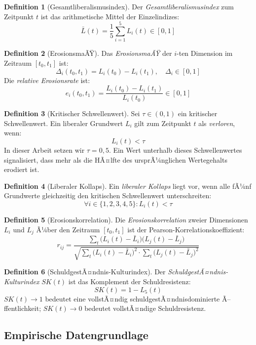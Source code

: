 ﻿\documentclass[a4paper,12pt]{article}
\theoremstyle{definition}
\newtheorem{definition}{Definition}
\begin{document}
\begin{definition}[Gesamtliberalismusindex]
Der \emph{Gesamtliberalismusindex} zum Zeitpunkt $t$ ist das arithmetische Mittel der Einzelindizes:
\[
\bar{L}(t) = \frac{1}{5} \sum_{i=1}^{5} L_i(t) \in [0,1]
\]
\end{definition}

\begin{definition}[ErosionsmaÃŸ]
Das \emph{ErosionsmaÃŸ} der $i$-ten Dimension im Zeitraum $[t_0, t_1]$ ist:
\[
\Delta_i(t_0, t_1) = L_i(t_0) - L_i(t_1), \quad \Delta_i \in [0,1]
\]
Die \emph{relative Erosionsrate} ist:
\[
e_i(t_0, t_1) = \frac{L_i(t_0) - L_i(t_1)}{L_i(t_0)} \in [0,1]
\]
\end{definition}

\begin{definition}[Kritischer Schwellenwert]
Sei $\tau \in (0,1)$ ein kritischer Schwellenwert. Ein liberaler Grundwert $L_i$ gilt zum Zeitpunkt $t$ als \emph{verloren}, wenn:
\[
L_i(t) < \tau
\]
In dieser Arbeit setzen wir $\tau = 0{,}5$. Ein Wert unterhalb dieses Schwellenwertes signalisiert, dass mehr als die HÃ¤lfte des ursprÃ¼nglichen Wertegehalts erodiert ist.
\end{definition}

\begin{definition}[Liberaler Kollaps]
Ein \emph{liberaler Kollaps} liegt vor, wenn alle fÃ¼nf Grundwerte gleichzeitig den kritischen Schwellenwert unterschreiten:
\[
\forall i \in \{1, 2, 3, 4, 5\}: L_i(t) < \tau
\]
\end{definition}

\begin{definition}[Erosionskorrelation]
Die \emph{Erosionskorrelation} zweier Dimensionen $L_i$ und $L_j$ Ã¼ber den Zeitraum $[t_0, t_1]$ ist der Pearson-Korrelationskoeffizient:
\[
r_{ij} = \frac{\sum_t \bigl(L_i(t) - \bar{L}_i\bigr)\bigl(L_j(t) - \bar{L}_j\bigr)}
{\sqrt{\sum_t \bigl(L_i(t) - \bar{L}_i\bigr)^2 \cdot \sum_t \bigl(L_j(t) - \bar{L}_j\bigr)^2}}
\]
\end{definition}

\begin{definition}[SchuldgestÃ¤ndnis-Kulturindex]
Der \emph{SchuldgestÃ¤ndnis-Kulturindex} $SK(t)$ ist das Komplement der Schuldresistenz:
\[
SK(t) = 1 - L_5(t)
\]
$SK(t) \to 1$ bedeutet eine vollstÃ¤ndig schuldgestÃ¤ndnisdominierte Ã–ffentlichkeit; $SK(t) \to 0$ bedeutet vollstÃ¤ndige Schuldresistenz.
\end{definition}

\subsection{Empirische Datengrundlage}
\end{document}
